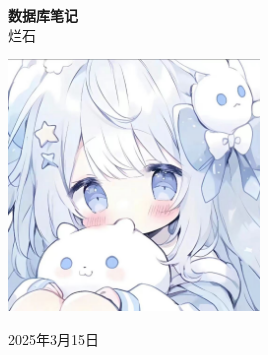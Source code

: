 \documentclass[UTF8,a4paper,12pt,autoindent=true,fontset=none,zihao=-4,scheme=chinese,space=auto]{ctexart}
\begin{document}
\begin{titlepage}
    \centering %
    \vspace{2cm} %
    {\Huge \textbf{数据库笔记}} \\
    \vspace{1.5cm}
    {\Large 烂石} \\
    \vspace{2cm}
    \begin{flushleft}
        \centering %
        \includegraphics[width=0.5\textwidth]{static/images/logo.jpg} %
    \end{flushleft}
    \vfill
    {\large 2025年3月15日}
\end{titlepage}












\end{document}
